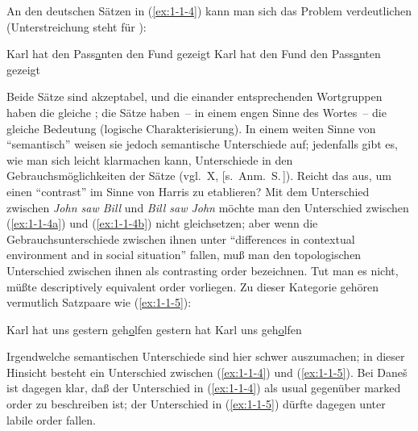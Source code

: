 \documentclass[output=paper]{langsci/langscibook}
\begin{document}
An den deutschen Sätzen in (\ref{ex:1-1-4}) kann man sich das Problem verdeutlichen (Unterstreichung steht für ):
\begin{exe}
\ex\label{ex:1-1-4}
\begin{xlist}
\ex\label{ex:1-1-4a} Karl hat den Pass\underline{\underline{a}}nten den Fund gezeigt
\ex\label{ex:1-1-4b} Karl hat den Fund den Pass\underline{\underline{a}}nten gezeigt
\end{xlist}
\end{exe}
Beide Sätze sind akzeptabel, und die einander entsprechenden Wortgruppen haben
die gleiche ; die Sätze haben\ -- in einem engen Sinne des Wortes~-- die gleiche Bedeutung (logische Charakterisierung). In einem weiten Sinne von
"`semantisch"' weisen sie jedoch semantische Unterschiede auf; jedenfalls gibt es, wie
man sich leicht klarmachen kann, Unterschiede in den Gebrauchsmöglichkeiten der
Sätze (vgl.\ X, [s.\ Anm.\ S.\,\pageref{fn-herausgeber-topo}]). Reicht das aus, um einen "`contrast"' im Sinne von Harris zu etablieren? Mit dem Unterschied zwischen \emph{John saw Bill} und \emph{Bill saw John} möchte
man den Unterschied zwischen (\ref{ex:1-1-4a}) und (\ref{ex:1-1-4b}) nicht gleichsetzen; aber wenn die Gebrauchsunterschiede zwischen ihnen unter "`differences in contextual environment
and in social situation"' fallen, muß man den topologischen Unterschied zwischen
ihnen als contrasting order bezeichnen. Tut man es nicht, müßte descriptively equivalent order vorliegen. Zu dieser Kategorie gehören vermutlich Satzpaare wie (\ref{ex:1-1-5}):
\begin{exe}
\ex\label{ex:1-1-5}
\begin{xlist}
\ex\label{ex:1-1-5a} Karl hat uns gestern geh\underline{\underline{o}}lfen
\ex\label{ex:1-1-5b} gestern hat Karl uns geh\underline{\underline{o}}lfen
\end{xlist}
\end{exe}
Irgendwelche semantischen Unterschiede sind hier schwer auszumachen; in dieser
Hinsicht besteht ein Unterschied zwischen (\ref{ex:1-1-4}) und (\ref{ex:1-1-5}). Bei Dane\v{s} ist dagegen klar, daß der Unterschied in (\ref{ex:1-1-4}) als usual gegenüber marked order zu beschreiben ist; der Unterschied in (\ref{ex:1-1-5}) dürfte dagegen unter labile order fallen.
\end{document}
